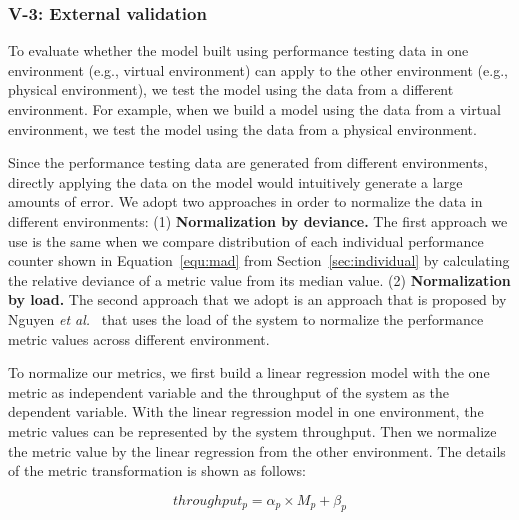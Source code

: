 \subsubsection{V-3: External validation}
To evaluate whether the model built using performance testing data in one environment (e.g., virtual environment) can apply to the other environment (e.g., physical environment), we test the model using the data from a different environment. For example, when we build a model using the data from a virtual environment, we test the model using the data from a physical environment. 

Since the performance testing data are generated from different environments, directly applying the data on the model would intuitively generate a large amounts of error. We adopt two approaches in order to normalize the data in different environments: (1) \textbf{Normalization by deviance.} The first approach we use is the same when we compare distribution of each individual performance counter shown in Equation~\ref{equ:mad} from Section~\ref{sec:individual} by calculating the relative deviance of a metric value from its median value. (2) \textbf{Normalization by load.} The second approach that we adopt is an approach that is proposed by Nguyen \textit{et al.}~\cite{Nguyen:2012:ADP:2188286.2188344} that uses the load of the system to normalize the performance metric values across different environment. 



To normalize our metrics, we first build a linear regression model with the one metric as independent variable and the throughput of the system as the dependent variable. With the linear regression model in one environment, the metric values can be represented by the system throughput. Then we normalize the metric value by the linear regression from the other environment. The details of the metric transformation is shown as follows:

\begin{equation*}
throughput_{p}= \alpha_{p} \times M_{p} + \beta_{p}
\end{equation*}

